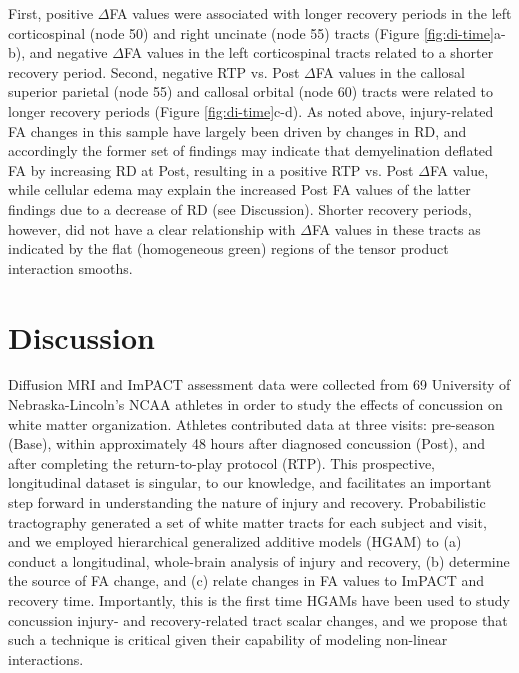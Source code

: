 \documentclass[12pt]{article}
\begin{document}
First, positive $\Delta$FA values were associated with longer recovery periods in the left corticospinal (node 50) and right uncinate (node 55) tracts (Figure \ref{fig:di-time}a-b), and negative $\Delta$FA values in the left corticospinal tracts related to a shorter recovery period. Second, negative RTP vs. Post $\Delta$FA values in the callosal superior parietal (node 55) and callosal orbital (node 60) tracts were related to longer recovery periods (Figure \ref{fig:di-time}c-d). As noted above, injury-related FA changes in this sample have largely been driven by changes in RD, and accordingly the former set of findings may indicate that demyelination deflated FA by increasing RD at Post, resulting in a positive RTP vs. Post $\Delta$FA value, while cellular edema may explain the increased Post FA values of the latter findings due to a decrease of RD (see Discussion). Shorter recovery periods, however, did not have a clear relationship with $\Delta$FA values in these tracts as indicated by the flat (homogeneous green) regions of the tensor product interaction smooths.


\section{Discussion}
\label{sec:disc}
Diffusion MRI and ImPACT assessment data were collected from 69 University of Nebraska-Lincoln's NCAA athletes in order to study the effects of concussion on white matter organization. Athletes contributed data at three visits: pre-season (Base), within approximately 48 hours after diagnosed concussion (Post), and after completing the return-to-play protocol (RTP). This prospective, longitudinal dataset is singular, to our knowledge, and facilitates an important step forward in understanding the nature of injury and recovery. Probabilistic tractography generated a set of white matter tracts for each subject and visit, and we employed hierarchical generalized additive models (HGAM) to (a) conduct a longitudinal, whole-brain analysis of injury and recovery, (b) determine the source of FA change, and (c) relate changes in FA values to ImPACT and recovery time. Importantly, this is the first time HGAMs have been used to study concussion injury- and recovery-related tract scalar changes, and we propose that such a technique is critical given their capability of modeling non-linear interactions.

\end{document}

